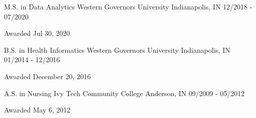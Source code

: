 
\begin{cventries}

  \cventry
    {M.S. in Data Analytics} %
    {Western Governors University} %
    {Indianapolis, IN} %
    {12/2018 - 07/2020} %
    {
      \begin{cvitems} %
        \item {Awarded Jul 30, 2020}
      \end{cvitems}
    }

  \cventry
    {B.S. in Health Informatics} %
    {Western Governors University} %
    {Indianapolis, IN} %
    {01/2014 - 12/2016} %
    {
      \begin{cvitems} %
        \item {Awarded December 20, 2016}
      \end{cvitems}
    }


  \cventry
    {A.S. in Nursing} %
    {Ivy Tech Community College} %
    {Anderson, IN} %
    {09/2009 - 05/2012} %
    {
      \begin{cvitems} %
        \item {Awarded May 6, 2012}
      \end{cvitems}
    }

\end{cventries}
